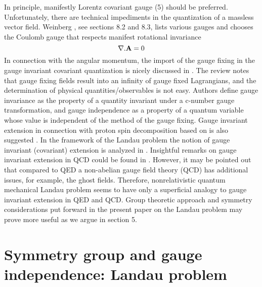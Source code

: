 \documentclass[aps, singlecolumn, showpacs]{revtex4-2}
\begin{document}
In principle, manifestly Lorentz covariant gauge (5) should be preferred. Unfortunately, there are technical impediments in the quantization of a massless vector field. Weinberg \cite{23}, see sections 8.2 and 8.3, lists various gauges and chooses the Coulomb gauge that respects manifest rotational invariance
\begin{equation}
{\bf \nabla}.{\bf A} =0
\end{equation}
In connection with the angular momentum, the import of the gauge fixing in the gauge invariant covariant quantization is nicely discussed in \cite{12}. The review \cite{4} notes that gauge fixing fields result into an infinity of gauge fixed Lagrangians, and the determination of physical quantities/observables is not easy. Authors \cite{4} define gauge invariance as the property of a quantity invariant under a c-number gauge transformation, and gauge independence as a property of a quantum variable whose value is independent of the method of the gauge fixing. Gauge invariant extension in connection with proton spin decomposition based on \cite{1} is also suggested \cite{4}. In the framework of the Landau problem the notion of gauge invariant (covariant) extension is analyzed in \cite{8}. Insightful remarks on gauge invariant extension in QCD could be found in \cite{7,8}. However, it may be pointed out that compared to QED a non-abelian gauge field theory (QCD) has additional issues, for example, the ghost fields. Therefore, nonrelativistic quantum mechanical Landau problem seems to have only a superficial analogy to gauge invariant extension in QED and QCD. Group theoretic approach and symmetry considerations put forward in the present paper on the Landau problem may prove more useful as we argue in section 5.

\section{\bf Symmetry group and gauge independence: Landau problem}
\end{document}

